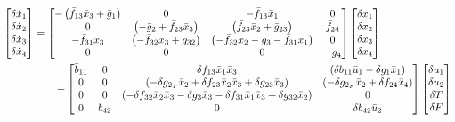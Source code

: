 \begin{align*}
    \begin{bmatrix} \delta \dot x_1 \\ \delta \dot x_2 \\ \delta \dot x_3 \\ \delta \dot x_4 \end{bmatrix} &= \begin{bmatrix} -\left(  \bar f_{13} \bar x_3 + \bar g_1  \right) &
                    0 &
                    -\bar f_{13} \bar x_1 &
                    0 \\
                    0 &
                    \left(  -\bar g_2 + \bar f_{23} \bar x_3  \right)&
                    \left( \bar f_{23} \bar x_2 + \bar g_{23} \right)&
                    \bar f_{24} \\
                    -\bar f_{31} \bar x_3 &
                    \left( -\bar f_{32} \bar x_3 + \bar g_{32}  \right) &
                    \left( -\bar f_{32} \bar x_2 - \bar g_3 - \bar f_{31} \bar x_1  \right) &
                    0 \\
                    0 & 0 & 0 & -g_4
                     \end{bmatrix}
    \begin{bmatrix} \delta x_1 \\ \delta x_2 \\ \delta x_3 \\ \delta x_4 \end{bmatrix}\\
            &\qquad+ \begin{bmatrix}  \bar b_{11} &
                            0 &
                            \delta f_{13} \bar x_1 \bar x_3 &
                            \left( \delta b_{11} \bar u_1- \delta g_1 \bar x_1 \right)
                            \\
                        0&
                        0 &
                        \left( -\delta g_{2_T} \bar x_2 + \delta f_{23} \bar x_2 \bar x_3 + \delta g_{23} \bar x_3 \right) &
                        \left( -\delta g_{2_F} \bar x_2 + \delta f_{24} \bar x_4  \right)
                        \\
                        0&
                        0&
                        \left( -\delta f_{32} \bar x_2 \bar x_3 - \delta g_3 \bar x_3 - \delta f_{31} \bar x_1 \bar x_3 + \delta g_{32} \bar x_2  \right) &
                        0
                        \\
                        0&
                        \bar b_{42}&
                        0&
                        \delta b_{42} \bar u_2
                         \end{bmatrix}
    \begin{bmatrix} \delta u_1 \\ \delta u_2 \\ \delta T \\ \delta F \end{bmatrix}
\end{align*}
